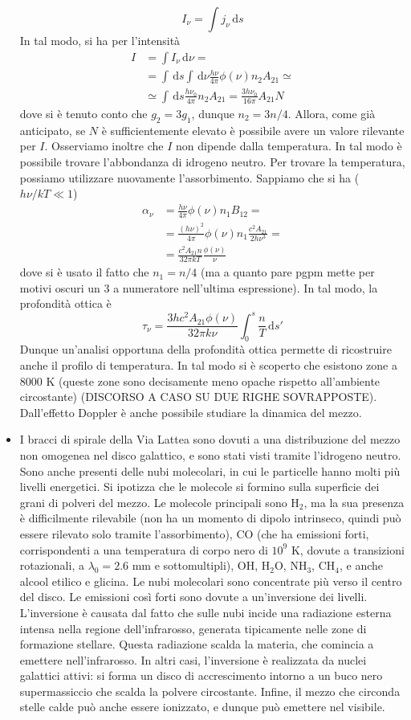 \documentclass[a4paper,11pt]{article}
\renewcommand{\d}{\mathrm{d}} %
\renewcommand{\d}{\,\mathrm{d}}
\theoremstyle{theorem}
\theoremstyle{definition}
\begin{document}
\begin{itemize}
		\[I_\nu=\int j_\nu\d s\]
		In tal modo, si ha per l'intensità
		\begin{align*}
			I&=\int I_\nu\d\nu=\\&=\int\d s\int\d\nu\frac{h\nu}{4\pi}\phi(\nu)n_2A_{21}\simeq\\&\simeq \int\d s\frac{h\nu_0}{4\pi}n_2A_{21}=\frac{3h\nu_0}{16\pi}A_{21}N
		\end{align*}
		dove si è tenuto conto che $g_2=3g_1$, dunque $n_2=3n/4$. Allora, come già anticipato, se $N$ è sufficientemente elevato è possibile avere un valore rilevante per $I$. Osserviamo inoltre che $I$ non dipende dalla temperatura. In tal modo è possibile trovare l'abbondanza di idrogeno neutro. Per trovare la temperatura, possiamo utilizzare nuovamente l'assorbimento. Sappiamo che si ha ($h\nu/kT\ll 1$)
		\begin{align*}\alpha_\nu&=\frac{h\nu}{4\pi}\phi(\nu)n_1B_{12}=\\&=\frac{(h\nu)^2}{4\pi}\phi(\nu)n_1\frac{c^2A_{21}}{2h\nu^3}=\\&=\frac{c^2A_{21}n}{32\pi kT}\frac{\phi(\nu)}{\nu}\end{align*}
		dove si è usato il fatto che $n_1=n/4$ (ma a quanto pare pgpm mette per motivi oscuri un 3 a numeratore nell'ultima espressione). In tal modo, la profondità ottica è
		\[\tau_\nu=\frac{3hc^2A_{21}\phi(\nu)}{32\pi k\nu}\int_{0}^{s}\frac{n}{T}\d s'\]
		Dunque un'analisi opportuna della profondità ottica permette di ricostruire anche il profilo di temperatura. In tal modo si è scoperto che esistono zone a 8000 K (queste zone sono decisamente meno opache rispetto all'ambiente circostante) (DISCORSO A CASO SU DUE RIGHE SOVRAPPOSTE). Dall'effetto Doppler è anche possibile studiare la dinamica del mezzo.
		\item I bracci di spirale della Via Lattea sono dovuti a una distribuzione del mezzo non omogenea nel disco galattico, e sono stati visti tramite l'idrogeno neutro. Sono anche presenti delle nubi molecolari, in cui le particelle hanno molti più livelli energetici. Si ipotizza che le molecole si formino sulla superficie dei grani di polveri del mezzo. Le molecole principali sono H$_2$, ma la sua presenza è difficilmente rilevabile (non ha un momento di dipolo intrinseco, quindi può essere rilevato solo tramite l'assorbimento), CO (che ha emissioni forti, corrispondenti a una temperatura di corpo nero di $10^9$ K, dovute a transizioni rotazionali, a $\lambda_0=2.6$ mm e sottomultipli), OH, H$_2$O, NH$_3$, CH$_4$, e anche alcool etilico e glicina. Le nubi molecolari sono concentrate più verso il centro del disco. Le emissioni così forti sono dovute a un'inversione dei livelli. L'inversione è causata dal fatto che sulle nubi incide una radiazione esterna intensa nella regione dell'infrarosso, generata tipicamente nelle zone di formazione stellare. Questa radiazione scalda la materia, che comincia a emettere nell'infrarosso. In altri casi, l'inversione è realizzata da nuclei galattici attivi: si forma un disco di accrescimento intorno a un buco nero supermassiccio che scalda la polvere circostante. Infine, il mezzo che circonda stelle calde può anche essere ionizzato, e dunque può emettere nel visibile.

\end{itemize}
\end{document}
